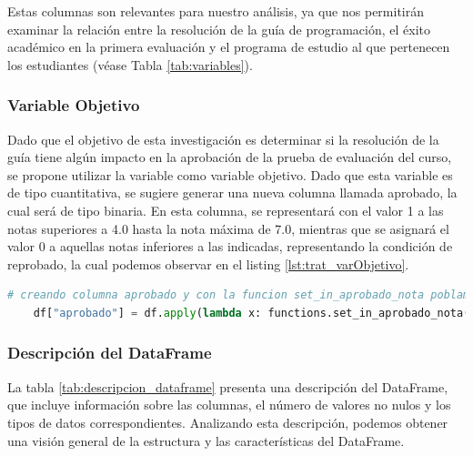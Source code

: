 Estas columnas son relevantes para nuestro análisis, ya que nos permitirán examinar la relación
entre la resolución de la guía de programación, el éxito académico en la primera evaluación y
el programa de estudio al que pertenecen los estudiantes (véase Tabla \ref{tab:variables}).

\subsubsection{Variable Objetivo}

Dado que el objetivo de esta investigación es determinar si la resolución de la guía tiene algún impacto en la aprobación de la prueba de evaluación del curso, se propone utilizar la variable  como variable objetivo. Dado que esta variable es de tipo cuantitativa, se sugiere generar una nueva columna llamada aprobado, la cual será de tipo binaria. En esta columna, se representará con el valor 1 a las notas superiores a 4.0 hasta la nota máxima de 7.0, mientras que se asignará el valor 0 a aquellas notas inferiores a las indicadas, representando la condición de reprobado, la cual podemos observar en el listing \ref{lst:trat_varObjetivo}.

\begin{lstlisting}[language=Python, caption=Tratamiento Variable Objetivo ,label=lst:trat_varObjetivo]
    # creando columna aprobado y con la funcion set_in_aprobado_nota poblamos la nueva columna.
    df["aprobado"] = df.apply(lambda x: functions.set_in_aprobado_nota(x["sol1"]), axis=1)
\end{lstlisting}

\subsubsection{Descripción del DataFrame}

La tabla \ref{tab:descripcion_dataframe} presenta una descripción del DataFrame, que incluye información sobre las columnas, el número de valores no nulos y los tipos de datos correspondientes. Analizando esta descripción, podemos obtener una visión general de la estructura y las características del DataFrame.

